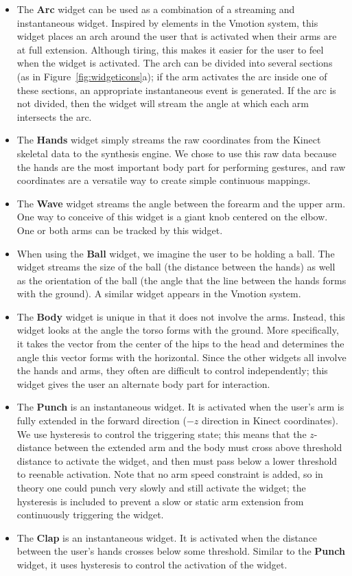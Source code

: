 \documentclass{nime-alternate}
\begin{document}
\begin{itemize}
\item The \textbf{Arc} widget can be used as a combination of a streaming and instantaneous widget.
Inspired by elements in the Vmotion system, this widget places an arch around the user that is 
activated when their arms are at full extension. Although tiring, this makes it easier for the 
user to feel when the widget is activated. The arch can be divided into several sections (as in
Figure~\ref{fig:widgeticons}a); if the arm activates the arc inside one of these sections, an
appropriate instantaneous event is generated. If the arc is not divided, then the widget will
stream the angle at which each arm intersects the arc.
\item The \textbf{Hands} widget simply streams the raw coordinates from the Kinect skeletal 
data to the synthesis engine. We chose to use this raw data because the hands are the
most important body part for performing gestures, and raw coordinates are a versatile way to
create simple continuous mappings.
\item The \textbf{Wave} widget streams the angle between the forearm and the upper arm. One
way to conceive of this widget is a giant knob centered on the elbow. One or both arms can
be tracked by this widget.
\item When using the \textbf{Ball} widget, we imagine the user to be holding a ball. The widget streams
the size of the ball (the distance between the hands) as well as the orientation of the ball
(the angle that the line between the hands forms with the ground). A similar widget appears
in the Vmotion system.
\item The \textbf{Body} widget is unique in that it does not involve the arms. Instead, this
widget looks at the angle the torso forms with the ground. More specifically, it takes the
vector from the center of the hips to the head and determines the angle this vector forms
with the horizontal. Since the other widgets all involve the hands and arms, they often
are difficult to control independently; this widget gives the user an alternate body part for interaction.
\item The \textbf{Punch} is an instantaneous widget. It is activated when the user's arm is
fully extended in the forward direction ($-z$ direction in Kinect coordinates). We use hysteresis to control the triggering state; this means that the $z$-distance
between the extended arm and the body must cross above threshold
distance to activate the widget, and then must pass below a lower threshold to reenable
activation. Note that no arm speed constraint is added, so in theory one could punch
very slowly and still activate the widget; the hysteresis is included to prevent a slow or 
static arm extension from continuously triggering the widget.
\item The \textbf{Clap} is an instantaneous widget. It is activated when the distance
between the user's hands crosses below some threshold. Similar to the \textbf{Punch} widget,
it uses hysteresis to control the activation of the widget.
\end{itemize}
\end{document}
